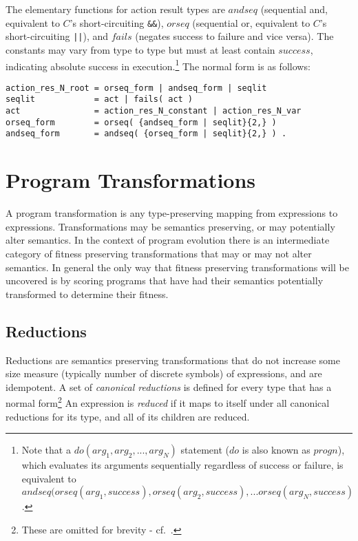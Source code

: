 \documentclass[letterpaper]{article}
\begin{document}
The elementary functions for action result types are $andseq$ (sequential and,
equivalent to $C$'s short-circuiting \verb|&&|), $orseq$ (sequential or,
equivalent to $C$'s short-circuiting \verb!||!), and $fails$ (negates success
to failure and vice versa). The constants may vary from type to type but must
at least contain $success$, indicating absolute success in
execution.\footnote{Note that a $do(arg_1,arg_2,...,arg_N)$ statement ($do$ is
  also known as $progn$), which evaluates its arguments sequentially regardless
  of success or failure, is equivalent to $andseq(orseq(arg_1,success),
  orseq(arg_2,success), ... orseq(arg_N,success)$.} The normal form is as
follows:
\begin{verbatim}
action_res_N_root = orseq_form | andseq_form | seqlit
seqlit            = act | fails( act )
act               = action_res_N_constant | action_res_N_var
orseq_form        = orseq( {andseq_form | seqlit}{2,} )
andseq_form       = andseq( {orseq_form | seqlit}{2,} ) .
\end{verbatim}


\section{Program Transformations}

A program transformation is any type-preserving mapping from expressions to
expressions. Transformations may be semantics preserving, or may potentially
alter semantics. In the context of program evolution there is an intermediate
category of fitness preserving transformations that may or may not alter
semantics. In general the only way that fitness preserving transformations will
be uncovered is by scoring programs that have had their semantics potentially
transformed to determine their fitness.

\subsection{Reductions}

Reductions are semantics preserving transformations that do not increase some
size measure (typically number of discrete symbols) of expressions, and are
idempotent. A set of \emph{canonical reductions} is defined for every type that
has a normal form\footnote{These are omitted for brevity -
  cf.~\cite{Me,MosesWiki}.} An expression is \emph{reduced} if it maps to
itself under all canonical reductions for its type, and all of its
children are reduced.
\end{document}
